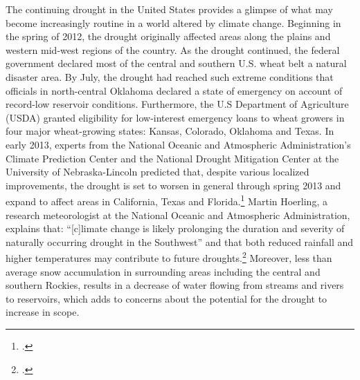 The continuing drought in the United States provides a glimpse of what may become increasingly routine in a world altered by climate change.
Beginning in the spring of 2012, the drought originally affected areas along the plains and western mid-west regions of the country. 
As the drought continued, the federal government declared most of the central and southern U.S. wheat belt a natural disaster area. 
By July, the drought had reached such extreme conditions that officials in north-central Oklahoma declared a state of emergency on account of record-low reservoir conditions. 
Furthermore, the U.S Department of Agriculture (USDA) granted eligibility for low-interest emergency loans to wheat growers in four major wheat-growing states: Kansas, Colorado, Oklahoma and Texas. 
In early 2013, experts from the National Oceanic and Atmospheric Administration's Climate Prediction Center and the National Drought Mitigation Center at the University of Nebraska-Lincoln predicted that, despite various localized improvements, the drought is set to worsen in general through spring 2013 and expand to affect areas in California, Texas and Florida.\footcite[][]{NOAAteleconf2013}
Martin Hoerling, a research meteorologist at the National Oceanic and Atmospheric Administration, explains that: ``[c]limate change is likely prolonging the duration and severity of naturally occurring drought in the Southwest'' and that both reduced rainfall and higher temperatures may contribute to future droughts.\footcite[][]{USHeatAndDrought}
Moreover, less than average snow accumulation in surrounding areas including the central and southern Rockies, results in a decrease of water flowing from streams and rivers to reservoirs, which adds to concerns about the potential for the drought to increase in scope.



